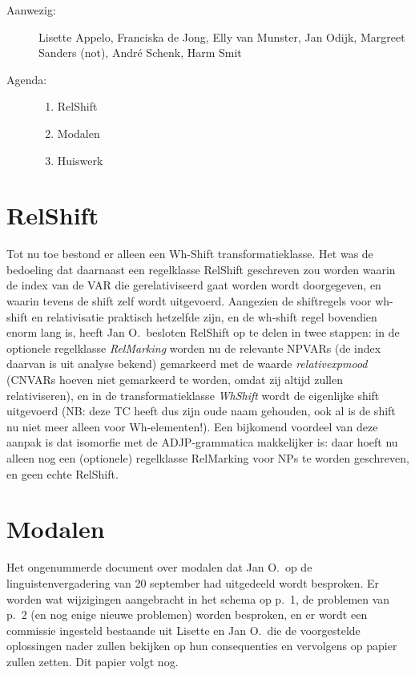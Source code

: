 

   \RosSupersedes{-}
   \MakeRosTitle
%
%
\begin{description}
\item[Aanwezig:] Lisette Appelo, Franciska de Jong, Elly van Munster,
                 Jan Odijk, Margreet Sanders (not),
                 Andr\'{e} Schenk, Harm Smit
\item[Agenda:]\mbox{}
  \begin{enumerate}
  \item RelShift
  \item Modalen
  \item Huiswerk
  \end{enumerate}
\end{description}

\section{RelShift}
Tot nu toe bestond er alleen een Wh-Shift transformatieklasse. Het was de 
bedoeling dat daarnaast een regelklasse RelShift geschreven zou worden waarin 
de index van de VAR die gerelativiseerd gaat worden wordt doorgegeven, en 
waarin 
tevens de shift zelf wordt uitgevoerd. Aangezien de shiftregels voor wh-shift 
en relativisatie praktisch hetzelfde zijn, en de wh-shift regel bovendien enorm 
lang is, heeft Jan O.\ besloten RelShift op te delen in twee stappen: in de 
optionele regelklasse {\em RelMarking\/} worden nu de 
relevante NPVARs (de index daarvan 
is uit analyse bekend) gemarkeerd met de waarde {\em 
relativexpmood\/} (CNVARs hoeven niet gemarkeerd te worden, omdat 
zij altijd zullen relativiseren), en in de transformatieklasse {\em WhShift\/}
wordt de eigenlijke shift uitgevoerd (NB: deze TC heeft dus zijn oude naam 
gehouden, ook al is de shift nu niet meer alleen voor Wh-elementen!). Een 
bijkomend voordeel van deze aanpak is dat isomorfie met de ADJP-grammatica 
makkelijker is: daar hoeft nu alleen nog een (optionele) regelklasse RelMarking 
voor NPs te worden geschreven, en geen echte RelShift.

\section{Modalen}
Het ongenummerde document over modalen dat Jan O.\ op de linguistenvergadering 
van 20 september had uitgedeeld wordt besproken. Er worden wat wijzigingen 
aangebracht in het schema op p.\ 1, de problemen van p.\ 2 (en nog enige nieuwe 
problemen) worden besproken, en er wordt een commissie ingesteld bestaande uit 
Lisette en Jan O.\ die de voorgestelde oplossingen nader zullen bekijken op hun 
consequenties en vervolgens op papier zullen zetten. Dit papier volgt nog.

